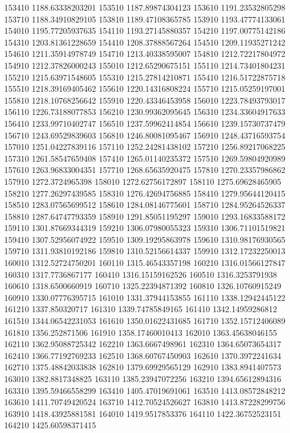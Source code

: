 {153410 1188.63338203201
153510 1187.89874304123
153610 1191.23532805298
153710 1188.34910829105
153810 1189.47108365785
153910 1193.47774133061
154010 1195.77205937635
154110 1193.27145880357
154210 1197.00775142186
154310 1203.81361228659
154410 1208.37888567264
154510 1209.11935271242
154610 1211.35914978749
154710 1213.40338595007
154810 1212.72217804972
154910 1212.37826000243
155010 1212.65290675151
155110 1214.73401804231
155210 1215.63971548605
155310 1215.27814210871
155410 1216.51722875718
155510 1218.39169405462
155610 1220.14316808224
155710 1215.05259197001
155810 1218.10768256642
155910 1220.43346453958
156010 1223.78493793017
156110 1226.73188077853
156210 1230.99362095645
156310 1234.33604917633
156410 1233.99710402747
156510 1237.59962414854
156610 1239.15730737479
156710 1243.69529839603
156810 1246.80081095467
156910 1248.43716593754
157010 1251.04227839116
157110 1252.24281438102
157210 1256.89217068225
157310 1261.58547659408
157410 1265.01140235372
157510 1269.59804920989
157610 1263.96833004351
157710 1268.65635920475
157810 1270.23357986862
157910 1272.3724965398
158010 1272.62756172897
158110 1275.69628465905
158210 1277.26297439585
158310 1276.42694756885
158410 1279.95644120415
158510 1283.07565699512
158610 1284.08146775601
158710 1284.95264526337
158810 1287.64747793359
158910 1291.85051195297
159010 1293.16833588172
159110 1301.87669344319
159210 1306.07980055323
159310 1306.71101519821
159410 1307.52956074922
159510 1309.19295863978
159610 1310.98176930565
159710 1311.93810192186
159810 1310.52156614337
159910 1312.17232250013
160010 1312.52724750201
160110 1315.46543357198
160210 1316.01566127847
160310 1317.7736867177
160410 1316.15159162526
160510 1316.3253791938
160610 1318.6500660919
160710 1325.22394871392
160810 1326.10760915249
160910 1330.07776395715
161010 1331.37944153855
161110 1338.12942445122
161210 1337.850320717
161310 1339.74785849165
161410 1342.14959286812
161510 1344.06542231053
161610 1350.01622431685
161710 1352.15712406089
161810 1356.252871506
161910 1358.17460010413
162010 1363.45638046155
162110 1362.95088725342
162210 1363.6667498961
162310 1364.65073654317
162410 1366.77192769233
162510 1368.60767450903
162610 1370.3972241634
162710 1375.48842033838
162810 1379.69929565129
162910 1383.8941407573
163010 1382.8817348825
163110 1385.23947072256
163210 1394.65612894316
163310 1395.59466558299
163410 1405.47019691061
163510 1413.08572848212
163610 1411.70749420524
163710 1412.70524526627
163810 1413.87228299756
163910 1418.43925881581
164010 1419.9517853376
164110 1422.36752523151
164210 1425.60598371415
}
